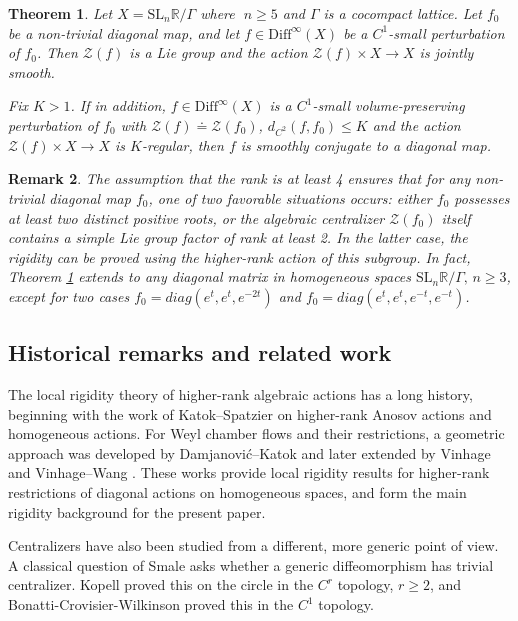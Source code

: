 \documentclass[11pt]{amsart}
\numberwithin{equation}{section}
\newcommand{\R}{\mathbb{R}}
\theoremstyle{plain}
\newtheorem{thm}{Theorem}[section]
\newtheorem{rmk}[thm]{Remark}
\begin{document}
\begin{thm}\label{cenrignongen}
   Let \(X = \mathrm{SL}_n\R/\Gamma\) where $\;n\ge 5$ and $\Gamma$ is a cocompact lattice. 
    Let $f_0$ be a non-trivial diagonal map, and let \(f\in \mathrm{Diff}^\infty(X)\) be a  \(C^1\)-small perturbation of \(f_0\). Then $\mathcal Z(f)$ is a Lie group and the action $\mathcal{Z}(f)\times X\to X$ is jointly smooth.
    
    Fix $K>1$. If in addition, \(f\in \mathrm{Diff}^\infty(X)\) is a \(C^1\)-small volume-preserving perturbation of \(f_0\) with
    \( \mathcal Z(f) \doteq \mathcal Z(f_0)\), $d_{C^2}(f,f_0)\le K$ and the action $\mathcal{Z}(f)\times X\to X$ is $K$-regular, then \(f\) is smoothly conjugate to a diagonal map.
\end{thm}

\begin{rmk}
    The assumption that the rank is at least 4 ensures that for any non-trivial diagonal map \(f_0\), one of two favorable situations occurs: either \(f_0\) possesses at least two distinct positive roots, or the algebraic centralizer \(\mathcal Z(f_0)\) itself contains a simple Lie group factor of rank at least 2. In the latter case, the rigidity can be proved using the higher-rank action of this subgroup. In fact, Theorem \ref{cenrignongen} extends to any diagonal matrix in homogeneous spaces $\mathrm{SL}_n\R/\Gamma,\,n\ge3$, except for two cases $f_0=diag(e^t,e^t,e^{-2t})$ and $f_0=diag(e^t,e^t,e^{-t},e^{-t})$.
\end{rmk}

\subsection{Historical remarks and related work}

The local rigidity theory of higher-rank algebraic actions has a long history,
beginning with the work of Katok--Spatzier \cite{KS} on higher-rank Anosov actions and
homogeneous actions. For Weyl chamber flows and their restrictions, a
geometric approach was developed by Damjanovi\'c--Katok \cite{DK} and later extended by
Vinhage \cite{Vinhage} and Vinhage--Wang \cite{VinWang}.  These works provide local rigidity results for
higher-rank restrictions of diagonal actions on homogeneous spaces, and form
the main rigidity background for the present paper.

Centralizers have also been studied from a different, more generic point of
view.  A classical question of Smale \cite{smale} asks whether a generic diffeomorphism has
trivial centralizer. Kopell \cite{Kopell} proved this on the circle in the $C^r$ topology, $r\geq 2$, and Bonatti-Crovisier-Wilkinson \cite{BCW} proved this in the
\(C^1\) topology.
\end{document}
